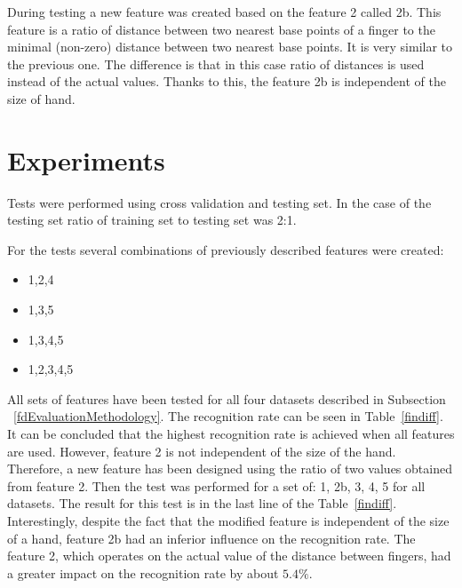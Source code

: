During testing a new feature was created based on the feature 2 called 2b. This feature is a ratio of distance between two nearest base points of a finger to the minimal (non-zero) distance between two nearest base points. It is very similar to the previous one. The difference is that in this case ratio of distances is used instead of the actual values. Thanks to this, the feature 2b is independent of the size of hand.

\section{Experiments}
Tests were performed using cross validation and testing set. In the case of the testing set ratio of training set to testing set was 2:1.

For the tests several combinations of previously described features were created:
\begin{itemize}
\item 1,2,4
\item 1,3,5
\item 1,3,4,5
\item 1,2,3,4,5
\end{itemize}

All sets of features have been tested for all four datasets described in Subsection ~\ref{fdEvaluationMethodology}. The recognition rate can be seen in Table~\ref{findiff}. It can be concluded that the highest recognition rate is achieved when all features are used. However, feature 2 is not independent of the size of the hand. Therefore, a new feature has been designed using the ratio of two values obtained from feature 2. Then the test was performed for a set of: 1, 2b, 3, 4, 5 for all datasets. The result for this test is in the last line of the Table~\ref{findiff}. Interestingly, despite the fact that the modified feature is independent of the size of a hand, feature 2b had an inferior influence on the recognition rate. The feature 2, which operates on the actual value of the distance between fingers, had a greater impact on the recognition rate by about $5.4\%$. 

